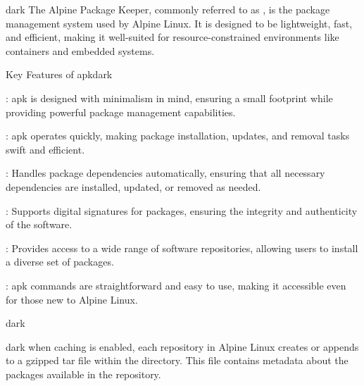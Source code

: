 \label{Alpine Package Keeper}
\begin{baseBoxThree}{}{dark}
    \bigskip
    The Alpine Package Keeper, commonly referred to as , is the package management system used by Alpine Linux.
    It is designed to be lightweight, fast, and efficient, making it well-suited for resource-constrained environments like containers and embedded systems.
    \bigskip
    \begin{baseBoxThree}{Key Features of apk}{dark}
        \smallskip
        \begin{posnexItemize} 
            \item[\sA] : apk is designed with minimalism in mind, ensuring a small footprint while providing powerful package management capabilities.
            \item[\sA] : apk operates quickly, making package installation, updates, and removal tasks swift and efficient.
            \item[\sA] : Handles package dependencies automatically, ensuring that all necessary dependencies are installed, updated, or removed as needed.
            \item[\sA] : Supports digital signatures for packages, ensuring the integrity and authenticity of the software.
            \item[\sA] : Provides access to a wide range of software repositories, allowing users to install a diverse set of packages.
            \item[\sA] : apk commands are straightforward and easy to use, making it accessible even for those new to Alpine Linux.
        \end{posnexItemize}
        \smallskip
    \end{baseBoxThree}
    \smallskip
    \label{APKINDEX File Structure}
    \begin{baseBoxThree}{}{dark}
        \smallskip
        \begin{baseBoxThree}{}{dark}
            \smallskip
            when caching is enabled, each repository in Alpine Linux creates or appends to a gzipped tar file within the  directory.
            This file contains metadata about the packages available in the repository.

\end{baseBoxThree}
\end{baseBoxThree}
\end{baseBoxThree}
